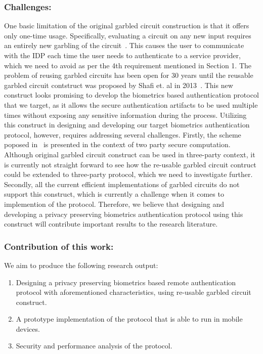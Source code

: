 \documentclass[10pt]{article}
\begin{document}
\subsubsection*{Challenges:}
One basic limitation of the original garbled circuit construction is that it offers only one-time usage. Specifically, evaluating a circuit on any 
new input requires an entirely new garbling of the circuit~\cite{reusablegc}. This causes the user to communicate with the IDP each time the user 
needs to authenticate to a service provider, which we need to avoid as per the 4th requirement mentioned in Section 1. The problem of reusing garbled 
circuits has been open for 30 years until the reusable garbled circuit contstruct was proposed by Shafi et. al in 2013~\cite{reusablegc}. This new 
construct looks promising to develop the biometrics based authentication protocol that we target, as it allows the secure authentication artifacts to 
be used multiple times without exposing any sensitive information during the process.
Utilizing this construct in designing and developing our target biometrics authentication protocol, however, requires addressing several challenges. 
Firstly, the scheme poposed in~\cite{reusablegc} is presented in the context of two party secure computation. Although original garbled circuit 
construct can be used in three-party context, it is currently not straight forward to see how the re-usable garbled circuit contruct could be 
extended to three-party protocol, which we need to investigate further. Secondly, all the current efficient implementations of garbled circuits do not 
support this construct, which is currently a challenge when it comes to implemention of the protocol. Therefore, we believe that designing and 
developing a privacy preserving biometrics authentication protocol using this construct will contribute important results to the research literature. 

\subsubsection*{Contribution of this work:}
We aim to produce the following research output:
\begin{enumerate}
 \item Designing a privacy preserving biometrics based remote authentication protocol with aforementioned characteristics, using re-usable garbled 
circuit construct. 
 \item A prototype implementation of the protocol that is able to run in mobile devices.
 \item Security and performance analysis of the protocol.
\end{enumerate}
\end{document}
